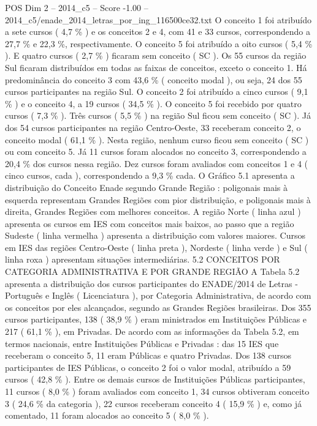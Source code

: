 \begin{textsample}{POS Dim 2 – 2014\_c5 – Score -1.00 – 2014\_c5/enade\_2014\_letras\_por\_ing\_116500ce32.txt}
O conceito 1 foi atribuído a sete cursos ( 4,7 \% ) e os conceitos 2 e 4, com 41 e 33 cursos, correspondendo a 27,7 \% e 22,3 \%, respectivamente.
O conceito 5 foi atribuído a oito cursos ( 5,4 \% ).
E quatro cursos ( 2,7 \% ) ficaram sem conceito ( SC ).
Os 55 cursos da região Sul ficaram distribuídos em todas as faixas de conceitos, exceto o conceito 1.
Há predominância do conceito 3 com 43,6 \% ( conceito modal ), ou seja, 24 dos 55 cursos participantes na região Sul.
O conceito 2 foi atribuído a cinco cursos ( 9,1 \% ) e o conceito 4, a 19 cursos ( 34,5 \% ).
O conceito 5 foi recebido por quatro cursos ( 7,3 \% ).
Três cursos ( 5,5 \% ) na região Sul ficou sem conceito ( SC ).
Já dos 54 cursos participantes na região Centro-Oeste, 33 receberam conceito 2, o conceito modal ( 61,1 \% ).
Nesta região, nenhum curso ficou sem conceito ( SC ) ou com conceito 5.
Já 11 cursos foram alocados no conceito 3, correspondendo a 20,4 \% dos cursos nessa região.
Dez cursos foram avaliados com conceitos 1 e 4 ( cinco cursos, cada ), correspondendo a 9,3 \% cada.
O Gráfico 5.1 apresenta a distribuição do Conceito Enade segundo Grande Região : poligonais mais à esquerda representam Grandes Regiões com pior distribuição, e poligonais mais à direita, Grandes Regiões com melhores conceitos.
A região Norte ( linha azul ) apresenta os cursos em IES com conceitos mais baixos, ao passo que a região Sudeste ( linha vermelha ) apresenta a distribuição com valores maiores.
Cursos em IES das regiões Centro-Oeste ( linha preta ), Nordeste ( linha verde ) e Sul ( linha roxa ) apresentam situações intermediárias. 5.2 CONCEITOS POR CATEGORIA ADMINISTRATIVA E POR GRANDE REGIÃO A Tabela 5.2 apresenta a distribuição dos cursos participantes do ENADE/2014 de Letras - Português e Inglês ( Licenciatura ), por Categoria Administrativa, de acordo com os conceitos por eles alcançados, segundo as Grandes Regiões brasileiras.
Dos 355 cursos participantes, 138 ( 38,9 \% ) eram ministrados em Instituições Públicas e 217 ( 61,1 \% ), em Privadas.
De acordo com as informações da Tabela 5.2, em termos nacionais, entre Instituições Públicas e Privadas : das 15 IES que receberam o conceito 5, 11 eram Públicas e quatro Privadas.
Dos 138 cursos participantes de IES Públicas, o conceito 2 foi o valor modal, atribuído a 59 cursos ( 42,8 \% ).
Entre os demais cursos de Instituições Públicas participantes, 11 cursos ( 8,0 \% ) foram avaliados com conceito 1, 34 cursos obtiveram conceito 3 ( 24,6 \% da categoria ), 22 cursos receberam conceito 4 ( 15,9 \% ) e, como já comentado, 11 foram alocados ao conceito 5 ( 8,0 \% ).

\end{textsample}
